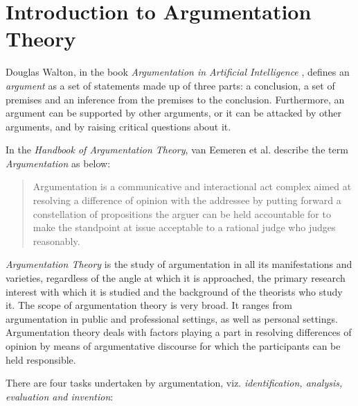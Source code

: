 \documentclass[sigconf]{acmart}
\begin{document}
%


%
\maketitle

\section{Introduction to Argumentation Theory}
Douglas Walton, in the book \textit{Argumentation in Artificial Intelligence }\cite{rahwan2009argumentation}, defines an \textit{argument} as a set of statements made up of three parts: a conclusion, a set of premises and an inference from the premises to the conclusion. Furthermore, an argument can be supported by other arguments, or it can be attacked by other arguments, and by raising critical questions about it.

In the \textit{Handbook of Argumentation Theory}, van Eemeren et al. describe the term \textit{Argumentation} as below:

\begin{quote}Argumentation is a communicative and interactional act complex aimed at resolving a difference of opinion with the addressee by putting forward a constellation of propositions the arguer can be held accountable for to make the standpoint at issue acceptable to a rational judge who judges reasonably.\cite{book:1206719}\end{quote}

\textit{Argumentation Theory} is the study of argumentation in all its manifestations and varieties, regardless of the angle at which it is approached, the primary research interest with which it is studied and the background of the theorists who study it. The scope of argumentation theory is very broad. It ranges from argumentation in public and professional settings, as well as personal settings. Argumentation theory deals with factors playing a part in resolving differences of opinion by means of argumentative discourse for which the participants can be held responsible.\cite{book:1206719}

There are four tasks undertaken by argumentation, viz. \textit{identification, analysis, evaluation and invention}\cite{rahwan2009argumentation}: 
\end{document}
